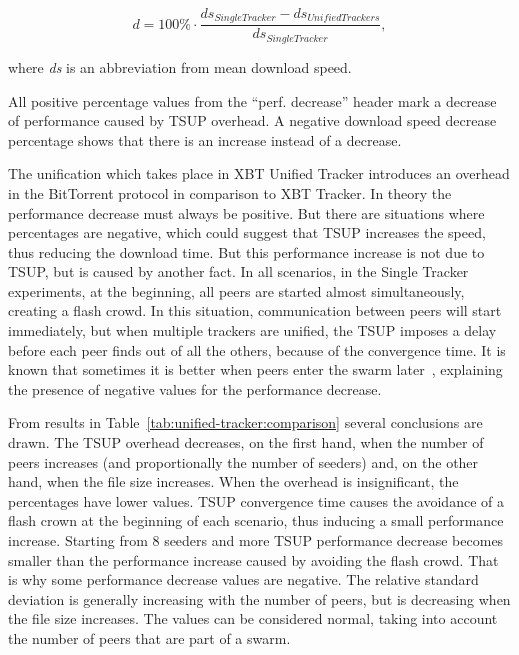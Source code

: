 
\begin{equation}\label{updates-swarmleader}
d = 100\% \cdot \frac{ds_{SingleTracker} - ds_{UnifiedTrackers}}{ds_{SingleTracker}} ,
\end{equation}


where \textit{ds} is an abbreviation from mean download speed.


All positive percentage values from the ``perf. decrease'' header mark a
decrease of performance caused by TSUP overhead. A negative download speed
decrease percentage shows that there is an increase instead of a decrease.

The unification which takes place in XBT Unified Tracker introduces an
overhead in the BitTorrent protocol in comparison to XBT Tracker. In theory
the performance decrease must always be positive. But there are situations
where percentages are negative, which could suggest that TSUP increases
the speed, thus reducing the download time. But this performance increase is
not due to TSUP, but is caused by another fact. In all scenarios, in the
Single Tracker experiments, at the beginning, all peers are started almost
simultaneously, creating a flash crowd. In this situation, communication
between peers will start immediately, but when multiple trackers are unified,
the TSUP imposes a delay before each peer finds out of all the others, because
of the convergence time.  It is known that sometimes it is better when peers
enter the swarm later~\cite{bt-analysis}, explaining the presence of negative
values for the performance decrease.




From results in Table~\ref{tab:unified-tracker:comparison} several
conclusions are drawn.  The TSUP overhead decreases, on the
first hand, when the number of peers increases (and proportionally the number
of seeders) and, on the other hand, when the file size increases. When the
overhead is insignificant, the percentages have lower values. TSUP convergence
time causes the avoidance of a flash crown at the beginning of each scenario,
thus inducing a small performance increase. Starting from 8 seeders and more
TSUP performance decrease becomes smaller than the performance increase caused
by avoiding the flash crowd. That is why some performance decrease values are
negative. The relative standard deviation is generally increasing with the
number of peers, but is decreasing when the file size increases. The values
can be considered normal, taking into account the number of peers that are
part of a swarm.

